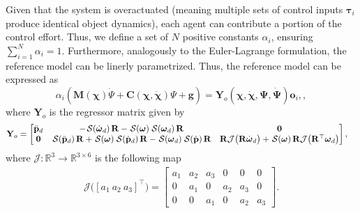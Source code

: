 Given that the system is overactuated (meaning multiple sets of control inputs $\boldsymbol{\tau}_i$ produce identical object dynamics), each agent can contribute a portion of the control effort. Thus, we define a set of $N$ positive constants $\alpha_i$, ensuring $\sum_{i=1}^N\alpha_i=1$. Furthermore, analogously to the Euler-Lagrange formulation, the reference model can be linerly parametrized. Thus, the reference model can be expressed as 
\begin{equation}
    \alpha _i \left(\mathbf {M}(\boldsymbol{\chi})\dot{\Psi} + \mathbf {C}(\boldsymbol{\chi},\dot{\boldsymbol{\chi}})\Psi + \mathbf {g} \right) = \mathbf{Y}_o(\boldsymbol{\chi}, \dot{\boldsymbol{\chi}}, \boldsymbol{\Psi}, \dot{\boldsymbol{\Psi}})\mathbf{o}_i, \label{eq:ref-model-linear-parametrization},
\end{equation}
where $\mathbf{Y}_o$ is the regressor matrix given by
\begin{align}
    \mathbf{Y}_o &= \begin{bmatrix}
        \ddot{\mathbf{p}}_d & -\SL[\dot{\boldsymbol{\omega}}_d]\mathbf{R}-\SL[\boldsymbol{\omega}]\SL[\boldsymbol{\omega}_d]\mathbf{R} & \mathbf{0}\\
        \mathbf{0} & \SL[\ddot{\mathbf{p}}_d]\mathbf{R} + \SL[\boldsymbol{\omega}]\SL[\dot{\mathbf{p}}_d]\mathbf{R} - \SL[\boldsymbol{\omega}_d]\SL[\dot{\mathbf{p}}]\mathbf{R} & \mathbf{R}\mathcal{J}\bigl(\mathbf{R}\dot{\boldsymbol{\omega}}_d\bigr) + \SL[\boldsymbol{\omega}]\mathbf{R}\mathcal{J}\bigl(\mathbf{R}^\top\boldsymbol{\omega}_d\bigr)
    \end{bmatrix},
\end{align}
where $\mathcal{J}:\mathbb{R}^3\to\mathbb{R}^{3\times6}$ is the following map
\begin{align}
    \mathcal{J}\bigl([a_1\ a_2\ a_3]^\top\bigr)=\begin{bmatrix}
        a_1 & a_2 & a_3 & 0 & 0 & 0 \\
        0 & a_1 & 0 & a_2 & a_3 & 0 \\
        0 & 0 & a_1 & 0 & a_2 & a_3
    \end{bmatrix}.
\end{align}
